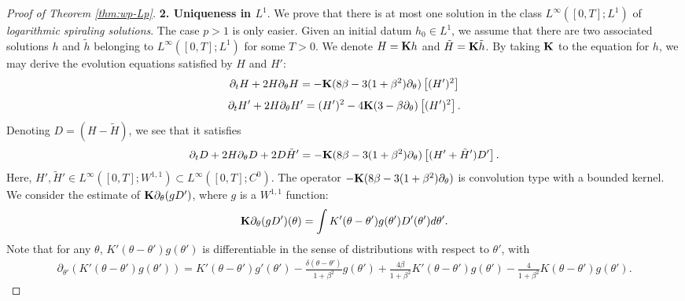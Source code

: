 \documentclass[10pt]{article}
\theoremstyle{definition}
\theoremstyle{remark}
\numberwithin{equation}{section}
\newcommand{\rd}{\partial}
\newcommand{\0}{\emptyset}
\newcommand{\bt}{\beta}
\newcommand{\dlt}{\delta}
\newcommand{\tht}{\theta}
\newcommand{\bfK}{{\bf K}}
\begin{document}
\begin{proof}[Proof of Theorem \ref{thm:wp-Lp}]
		\noindent \textbf{2. Uniqueness in $L^1$}.  We prove that there is at most one solution in the class $L^\infty([0,T];L^1)$ of \textit{logarithmic spiraling solutions}. The case $p>1$ is only easier. Given an initial datum $h_0 \in L^1$, we assume that there are two associated solutions $h$ and $\tilde{h}$ belonging to $L^\infty([0,T];L^1)$ for some $T>0$. We denote $H = \bfK h$ and $\tilde{H} = \bfK\tilde{h}$. By taking $\bfK$ to the equation for $h$, we may derive the evolution equations satisfied by $H$ and $H'$: \begin{equation}\label{eq:H}
			\begin{split}
				\rd_tH + 2H \rd_\tht H = -\bfK(8\bt - 3(1+\bt^2)\rd_\tht)\left[ (H')^2  \right]
			\end{split}
		\end{equation}\begin{equation}\label{eq:H-prime}
			\begin{split}
				\rd_t H' + 2H \rd_\tht H' = (H')^2 - 4 \bfK (3-\bt\rd_\tht)\left[ (H')^2 \right]. 
			\end{split}
		\end{equation} Denoting $D = (H-\tilde{H}) $, we see that it satisfies \begin{equation}\label{eq:D}
			\begin{split}
				\rd_t D + 2H \rd_\tht D + 2D\tilde{H}' =   - \bfK(8\bt -3(1+\bt^2)\rd_\tht) \left[  (H'+ \tilde{H}')D' \right].
			\end{split}
		\end{equation} Here, $H', \tilde{H}' \in L^\infty([0,T];W^{1,1}) \subset L^\infty([0,T];C^0)$. The operator $  - \bfK(8\bt -3(1+\bt^2)\rd_\tht) $ is convolution type with a bounded kernel. We consider the estimate of $\bfK\rd_\tht (g D')$, where $g$ is a $W^{1,1}$ function: \begin{equation*}
			\begin{split}
				\bfK\rd_\tht (g D')(\tht) = \int K'(\tht-\tht') g(\tht') D'(\tht') d\tht'. 
			\end{split}
		\end{equation*} Note that for any $\tht$, $K'(\tht-\tht') g(\tht')$ is differentiable in the sense of distributions with respect to $\tht'$, with \begin{equation*}
			\begin{split}
				\rd_{\tht'} \left( K'(\tht-\tht') g(\tht') \right) = K'(\tht-\tht') g'(\tht') - \frac{\dlt(\tht-\tht')}{1+\bt^2}g(\tht') + \frac{4\bt}{1+\bt^2}K'(\tht-\tht')g(\tht') - \frac{4}{1+\bt^2}K(\tht-\tht') g(\tht'). 

\end{split}
\end{equation*}
\end{proof}
\end{document}

